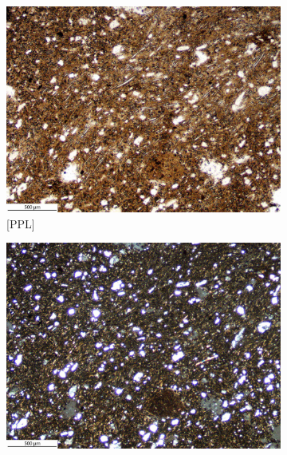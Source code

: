 \documentclass[a4paper]{article}
\begin{document}

\begin{figure}[H]
	\centering
	\begin{subfigure}[t]{.49\textwidth}
		\includegraphics[width=\textwidth]{ThinSections/4-1_4x_PPL.jpg}
		\caption{[PPL]}
	\end{subfigure}\hspace{.5em}\hfill
	\begin{subfigure}[t]{.49\textwidth}
		\includegraphics[width=\textwidth]{ThinSections/4-1_4x_XPL.jpg}

\end{subfigure}
\end{figure}
\end{document}
